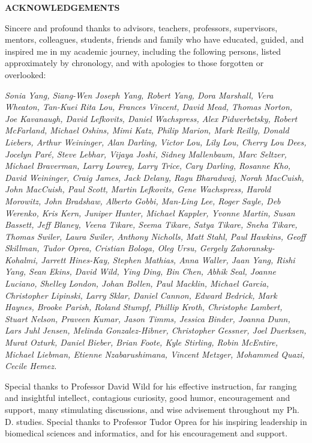 \begin{centering}
\textbf{ACKNOWLEDGEMENTS}\\
\vspace{\baselineskip}
\end{centering}

Sincere and profound thanks to advisors, teachers, professors, supervisors, mentors, colleagues, students, friends and family who have educated, guided, and inspired me in my academic journey, including the following persons, listed approximately by chronology, and with apologies to those forgotten or overlooked:

\begin{singlespace}
\textit{Sonia Yang, Siang-Wen Joseph Yang, Robert Yang, Dora Marshall,
Vera Wheaton, Tan-Kuei Rita Lou, Frances Vincent, David Mead, Thomas
Norton, Joe Kavanaugh, David Lefkovits, Daniel Wachspress, Alex
Pidwerbetsky, Robert McFarland, Michael Oshins, Mimi Katz, Philip
Marion, Mark Reilly, Donald Liebers, Arthur Weininger, Alan Darling,
Victor Lou, Lily Lou, Cherry Lou Dees, Jocelyn Par\'e, Steve Lebhar,
Vijaya Joshi, Sidney Mallenbaum, Marc Seltzer, Michael Braverman, Larry
Lowrey, Larry Trice, Cary Darling, Rosanne Kho, David Weininger, Craig
James, Jack Delany, Ragu Bharadwaj, Norah MacCuish, John MacCuish, Paul
Scott, Martin Lefkovits, Gene Wachspress, Harold Morowitz, John
Bradshaw, Alberto Gobbi, Man-Ling Lee, Roger Sayle, Deb Werenko, Kris
Kern, Juniper Hunter, Michael Kappler, Yvonne Martin, Susan Bassett,
Jeff Blaney, Veena Tikare, Seema Tikare, Satya Tikare, Sneha Tikare,
Thomas Swiler, Laura Swiler, Anthony Nicholls, Matt Stahl, Paul
Hawkins, Geoff Skillman, Tudor Oprea, Cristian Bologa, Oleg Ursu,
Gergely Zahoransky-Kohalmi, Jarrett Hines-Kay, Stephen Mathias, Anna
Waller, Jaan Yang, Rishi Yang, Sean Ekins, David Wild, Ying Ding, Bin Chen, 
Abhik Seal, Joanne Luciano, Shelley London, Johan Bollen, Paul Macklin, 
Michael Garcia, Christopher Lipinski, Larry Sklar, Daniel Cannon, Edward Bedrick,
Mark Haynes, Brooke Parish, Roland Stumpf, Phillip Kroth, Christophe Lambert,
Stuart Nelson, Praveen Kumar, Jason Timms, Jessica Binder, Joanna Dunn, 
Lars Juhl Jensen, Melinda Gonzalez-Hibner, Christopher Gessner, Joel Duerksen,
Murat Ozturk, Daniel Bieber, Brian Foote, Kyle Stirling, Robin McEntire,  Michael Liebman, Etienne Nzabarushimana, Vincent Metzger, Mohammed Quazi, Cecile Hemez.}
\end{singlespace}

Special thanks to Professor David Wild for his effective instruction, far ranging and insightful intellect, contagious curiosity, good humor, encouragement and support, many stimulating discussions, and wise advisement throughout my Ph. D. studies. Special thanks to Professor Tudor Oprea for his inspiring leadership in biomedical sciences and informatics, and for his encouragement and support. 
